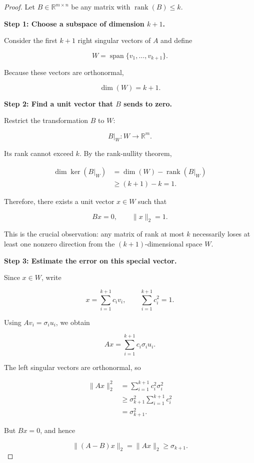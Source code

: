\documentclass[11pt]{article}
\begin{document}
\begin{proof}

Let $B\in\mathbb{R}^{m\times n}$ be
any matrix with $\operatorname{rank}(B)\leq k$.

\textbf{Step 1: Choose a subspace of
dimension $k+1$.}

Consider the first $k+1$ right
singular vectors of $A$ and define

\[
W=\operatorname{span}\{v_1,\ldots,v_{k+1}\}.
\]

Because these vectors are orthonormal,

\[
\dim(W)=k+1.
\]

\textbf{Step 2: Find a unit vector
that $B$ sends to zero.}

Restrict the transformation $B$ to $W$:

\[
B|_W:W\longrightarrow\mathbb{R}^m.
\]

Its rank cannot exceed $k$.
By the rank-nullity theorem,

\[
\begin{aligned}
\dim\ker(B|_W)
&=\dim(W)-\operatorname{rank}(B|_W)\\
&\geq(k+1)-k=1.
\end{aligned}
\]

Therefore, there exists a unit vector
$x\in W$ such that

\[
\boxed{Bx=0,\qquad \|x\|_2=1.}
\]

This is the crucial observation:
any matrix of rank at most $k$
necessarily loses at least one
nonzero direction from the
$(k+1)$-dimensional space $W$.

\textbf{Step 3: Estimate the error
on this special vector.}

Since $x\in W$, write

\[
x=\sum_{i=1}^{k+1}c_i v_i,
\qquad
\sum_{i=1}^{k+1}c_i^2=1.
\]

Using $Av_i=\sigma_i u_i$, we obtain

\[
Ax=\sum_{i=1}^{k+1}c_i\sigma_i u_i.
\]

The left singular vectors are
orthonormal, so

\[
\begin{aligned}
\|Ax\|_2^2
&=\sum_{i=1}^{k+1}c_i^2\sigma_i^2\\
&\geq \sigma_{k+1}^2
\sum_{i=1}^{k+1}c_i^2\\
&=\sigma_{k+1}^2.
\end{aligned}
\]

But $Bx=0$, and hence

\[
\|(A-B)x\|_2
=\|Ax\|_2\geq\sigma_{k+1}.
\]


\end{proof}
\end{document}
